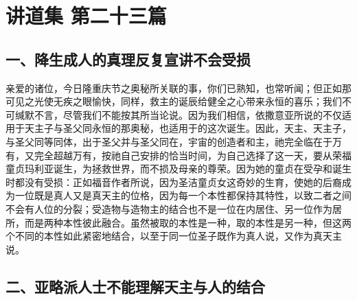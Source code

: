 

\section{讲道集 第二十三篇}

\par


\subsection{一、降生成人的真理反复宣讲不会受损}

亲爱的诸位，今日隆重庆节之奥秘所关联的事，你们已熟知，也常听闻；但正如那可见之光使无疾之眼愉快，同样，救主的诞辰给健全之心带来永恒的喜乐；我们不可缄默不言，尽管我们不能按其所当论说。因为我们相信，依撒意亚所说的不仅适用于天主子与圣父同永恒的那奥秘，也适用于的这次诞生。因此，天主、天主子，与圣父同等同体，出于圣父并与圣父同在，宇宙的创造者和主，祂完全临在于万有，又完全超越万有，按祂自己安排的恰当时间，为自己选择了这一天，要从荣福童贞玛利亚诞生，为拯救世界，而不损及母亲的尊荣。因为她的童贞在受孕和诞生时都没有受损：正如福音作者所说，因为圣洁童贞女这奇妙的生育，使她的后裔成为一位既是真人又是真天主的位格，因为每一个本性都保持其特性，以致二者之间不会有人位的分裂；受造物与造物主的结合也不是一位在内居住、另一位作为居所，而是两种本性彼此融合。虽然被取的本性是一种，取的本性是另一种，但这两个不同的本性如此紧密地结合，以至于同一位圣子既作为真人说，又作为真天主说。\par


\subsection{二、亚略派人士不能理解天主与人的结合}

